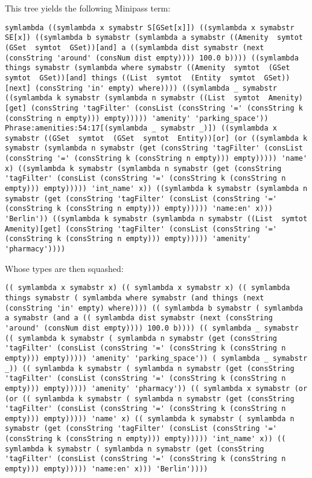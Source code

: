 \documentclass[main.tex]{subfiles}
\begin{document}
This tree yields the following Minipass term:
\begin{lstwrap}\begin{lstlisting}
symlambda ((symlambda x symabstr S[GSet[x]]) ((symlambda x symabstr SE[x]) ((symlambda b symabstr (symlambda a symabstr ((Amenity  symtot  (GSet  symtot  GSet))[and] a ((symlambda dist symabstr (next (consString 'around' (consNum dist empty)))) 100.0 b)))) ((symlambda things symabstr (symlambda where symabstr ((Amenity  symtot  (GSet  symtot  GSet))[and] things ((List  symtot  (Entity  symtot  GSet))[next] (consString 'in' empty) where)))) ((symlambda _ symabstr ((symlambda k symabstr (symlambda n symabstr ((List  symtot  Amenity)[get] (consString 'tagFilter' (consList (consString '=' (consString k (consString n empty))) empty))))) 'amenity' 'parking_space')) Phrase:amenities:54:17[(symlambda _ symabstr _)]) ((symlambda x symabstr ((GSet  symtot  (GSet  symtot  Entity))[or] (or ((symlambda k symabstr (symlambda n symabstr (get (consString 'tagFilter' (consList (consString '=' (consString k (consString n empty))) empty))))) 'name' x) ((symlambda k symabstr (symlambda n symabstr (get (consString 'tagFilter' (consList (consString '=' (consString k (consString n empty))) empty))))) 'int_name' x)) ((symlambda k symabstr (symlambda n symabstr (get (consString 'tagFilter' (consList (consString '=' (consString k (consString n empty))) empty))))) 'name:en' x))) 'Berlin')) ((symlambda k symabstr (symlambda n symabstr ((List  symtot  Amenity)[get] (consString 'tagFilter' (consList (consString '=' (consString k (consString n empty))) empty))))) 'amenity' 'pharmacy'))))
\end{lstlisting}\end{lstwrap}

Whose types are then squashed:
\begin{lstwrap}\begin{lstlisting}
(( symlambda x symabstr x) (( symlambda x symabstr x) (( symlambda things symabstr ( symlambda where symabstr (and things (next (consString 'in' empty) where)))) (( symlambda b symabstr ( symlambda a symabstr (and a (( symlambda dist symabstr (next (consString 'around' (consNum dist empty)))) 100.0 b)))) (( symlambda _ symabstr (( symlambda k symabstr ( symlambda n symabstr (get (consString 'tagFilter' (consList (consString '=' (consString k (consString n empty))) empty))))) 'amenity' 'parking_space')) ( symlambda _ symabstr _)) (( symlambda k symabstr ( symlambda n symabstr (get (consString 'tagFilter' (consList (consString '=' (consString k (consString n empty))) empty))))) 'amenity' 'pharmacy')) (( symlambda x symabstr (or (or (( symlambda k symabstr ( symlambda n symabstr (get (consString 'tagFilter' (consList (consString '=' (consString k (consString n empty))) empty))))) 'name' x) (( symlambda k symabstr ( symlambda n symabstr (get (consString 'tagFilter' (consList (consString '=' (consString k (consString n empty))) empty))))) 'int_name' x)) (( symlambda k symabstr ( symlambda n symabstr (get (consString 'tagFilter' (consList (consString '=' (consString k (consString n empty))) empty))))) 'name:en' x))) 'Berlin'))))
\end{lstlisting}\end{lstwrap}
\end{document}
